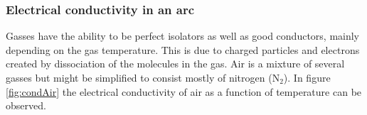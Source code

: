 \documentclass[10pt,a4paper,twoside]{article}
\begin{document}

\subsubsection{Electrical conductivity in an arc} \label{sec:eleCondArc}
Gasses have the ability to be perfect isolators as well as good conductors, mainly depending on the gas temperature. This is due to charged particles and electrons created by dissociation of the molecules in the gas. Air is a mixture of several gasses but might be simplified to consist mostly of nitrogen (N$_2$). In figure \ref{fig:condAir} the electrical conductivity of air as a function of temperature can be observed.   
\end{document}

